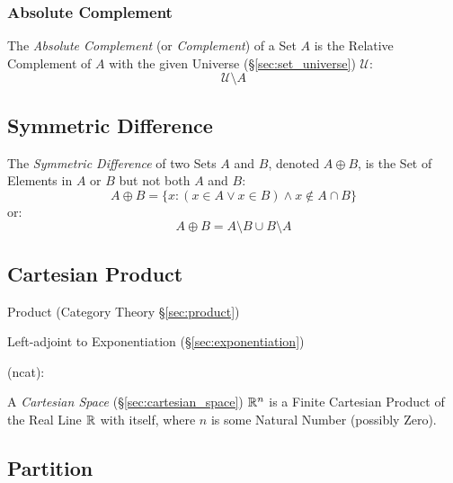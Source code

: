 \subsubsection{Absolute Complement}\label{sec:absolute_complement}

The \emph{Absolute Complement} (or \emph{Complement}) of a Set $A$ is
the Relative Complement of $A$ with the given Universe
(\S\ref{sec:set_universe}) $\mathcal{U}$:
\[
  \mathcal{U} \setminus A
\]



\subsection{Symmetric Difference}\label{sec:symmetric_difference}

The \emph{Symmetric Difference} of two Sets $A$ and $B$, denoted $A
\oplus B$, is the Set of Elements in $A$ or $B$ but not both $A$ and
$B$:
\[
  A \oplus B =
  \{ x : (x \in A \vee x \in B) \wedge x \notin A \cap B \}
\]
or:
\[
  A \oplus B = A \setminus B \cup B \setminus A
\]



\subsection{Cartesian Product}\label{sec:cartesian_product}

\fist Product (Category Theory \S\ref{sec:product})

Left-adjoint to Exponentiation (\S\ref{sec:exponentiation})

(ncat):

A \emph{Cartesian Space} (\S\ref{sec:cartesian_space}) $\mathbb{R}^n$ is a Finite
Cartesian Product of the Real Line $\mathbb{R}$ with itself, where $n$ is some
Natural Number (possibly Zero).



\subsection{Partition}\label{sec:set_partition}

